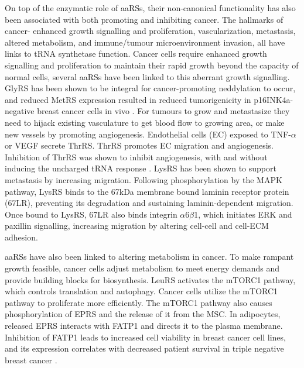 On top of the enzymatic role of aaRSs, their non-canonical functionality has also been associated with both promoting and inhibiting cancer.
The hallmarks of cancer- enhanced growth signalling and proliferation, vascularization, metastasis, altered metabolism, and immune/tumour microenvironment invasion, all have links to tRNA synthetase function.
Cancer cells require enhanced growth signalling and proliferation to maintain their rapid growth beyond the capacity of normal cells, several aaRSs have been linked to this aberrant growth signalling.
GlyRS has been shown to be integral for cancer-promoting neddylation to occur, and reduced MetRS expression resulted in reduced tumorigenicity in p16INK4a-negative breast cancer cells in vivo \cite{mo2016neddylation, deng2020role, kwon2018stabilization}.
For tumours to grow and metastasize they need to hijack existing vasculature to get blood flow to growing area, or make new vessels by promoting angiogenesis.
Endothelial cells (EC) exposed to TNF-$\alpha$ or VEGF secrete ThrRS.
ThrRS promotes EC migration and angiogenesis.
Inhibition of ThrRS was shown to inhibit angiogenesis, with and without inducing the uncharged tRNA response \cite{williams2013secreted, mirando2015aminoacyl}.
LysRS has been shown to support metastasis by increasing migration.
Following phosphorylation by the MAPK pathway, LysRS binds to the 67kDa membrane bound laminin receptor protein (67LR), preventing its degradation and sustaining laminin-dependent migration.
Once bound to LysRS, 67LR also binds integrin $\alpha$6$\beta$1, which initiates ERK and paxillin signalling, increasing migration by altering cell-cell and cell-ECM adhesion.

aaRSs have also been linked to altering metabolism in cancer.
To make rampant growth feasible, cancer cells adjust metabolism to meet energy demands and provide building blocks for biosynthesis.
LeuRS activates the mTORC1 pathway, which controls translation and autophagy.
Cancer cells utilize the mTORC1 pathway to proliferate more efficiently.
The mTORC1 pathway also causes phosphorylation of EPRS and the release of it from the MSC.
In adipocytes, released EPRS interacts with FATP1 and directs it to the plasma membrane.
Inhibition of FATP1 leads to increased cell viability in breast cancer cell lines, and its expression correlates with decreased patient survival in triple negative breast cancer \cite{mendes2019unraveling}.

